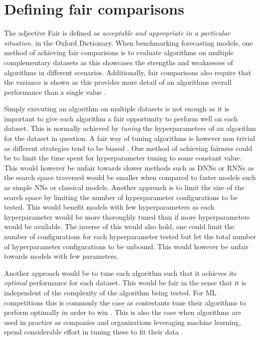 \section{Defining fair comparisons}
\label{sec:fair_comparisons}
The adjective Fair is defined as \textit{acceptable and appropriate in a particular situation.} in the Oxford Dictionary. When benchmarking forecasting models, one method of achieving fair comparisons is to evaluate algorithms on multiple complementary datasets as this showcases the strengths and weaknesses of algorithms in different scenarios. Additionally, fair comparisons also require that the variance is shown as this provides more detail of an algorithms overall performance than a single value \cite{bouthillier2021accounting}.

Simply executing an algorithm on multiple datasets is not enough as it is important to give each algorithm a fair opportunity to perform well on each dataset. This is normally achieved by \textit{tuning} the hyperparameters of an algorithm for the dataset in question. A fair way of tuning algorithms is however non trivial as different strategies tend to be biased \cite{sivaprasad2020optimizer}. One method of achieving fairness could be to limit the time spent for hyperparameter tuning to some constant value. This would however be unfair towards slower methods such as DNNs or RNNs as the search space traversed would be smaller when compared to faster models such as simple NNs or classical models. Another approach is to limit the size of the search space by limiting the number of hyperparameter configurations to be tested. This would benefit models with few hyperparameters as each hyperparameter would be more thoroughly tuned than if more hyperparameters would be available. The inverse of this would also hold, one could limit the number of configurations for each hyperparameter tested but let the total number of hyperparameter configurations to be unbound. This would however be unfair towards models with few parameters.

Another approach would be to tune each algorithm such that it achieves its \textit{optimal} performance for each dataset. This would be fair in the sense that it is independent of the complexity of the algorithm being tested. For ML competitions this is commonly the case as contestants tune their algorithms to perform optimally in order to win \cite{roelofs2019meta}. This is also the case when algorithms are used in practice as companies and organizations leveraging machine learning, spend considerable effort in tuning these to fit their data \cite{beam2020challenges}.

